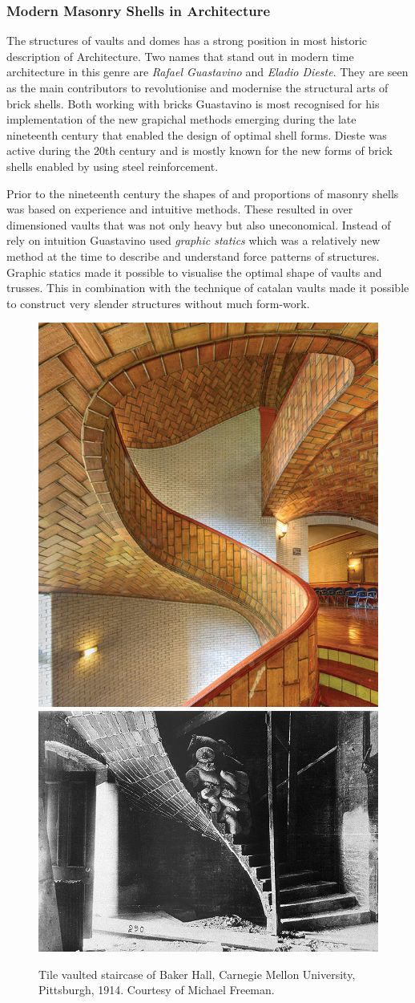 \subsubsection{Modern Masonry Shells in Architecture}



The structures of vaults and domes has a strong position in most historic description of Architecture. Two names that stand out in modern time architecture in this genre are \textit{Rafael Guastavino} and \textit{Eladio Dieste}. They are seen as the main contributors to revolutionise and modernise the structural arts of brick shells. Both working with bricks Guastavino is most recognised for his implementation of the new grapichal methods emerging during the late nineteenth century that enabled the design of optimal shell forms. Dieste was active during the 20th century and is mostly known for the new forms of brick shells enabled by using steel reinforcement.

Prior to the nineteenth century the shapes of and proportions of masonry shells was based on experience and intuitive methods. These resulted in over dimensioned vaults that was not only heavy but also uneconomical\cite{ref:Dieste}.  
Instead of rely on intuition Guastavino used \textit{graphic statics} which was a relatively new method at the time to describe and understand force patterns of structures. Graphic statics made it possible to visualise the optimal shape of vaults and trusses. This in combination with the technique of catalan vaults made it possible to construct very slender structures without much form-work.

\begin{figure}[H]
\centering
\includegraphics[height=0.4\linewidth ]{figure/Introduction/GuastovinoStair.jpg}
\includegraphics[height=0.4\linewidth ]{figure/Introduction/GuastavinoStair2.jpg}
\caption{Tile vaulted staircase of Baker Hall, Carnegie Mellon University, Pittsburgh, 1914. Courtesy of Michael Freeman.}
\end{figure}

